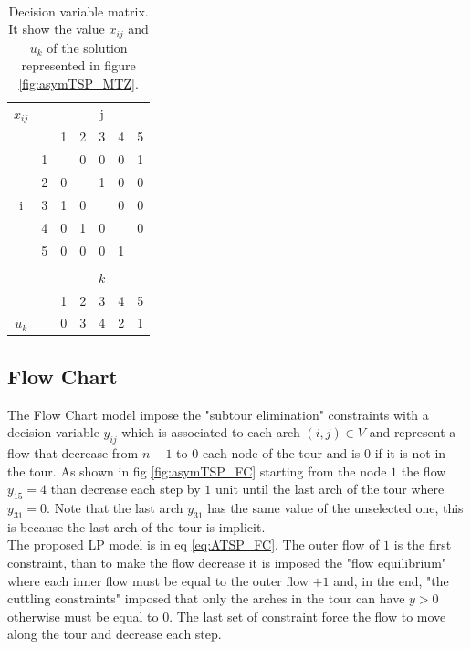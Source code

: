 \begin{table}[h!]
	\begin{center}$  $
		\caption{Decision variable matrix. It show the value $ x_{ij} $ and $ u_k $ of the solution represented in figure \ref{fig:asymTSP_MTZ}. }
		\label{tab:asymTSP_MTZ_solution}
		\begin{tabular}{cc|c|c|c|c|c|}
			 $ x_{ij} $ & \multicolumn{1}{c}{} & \multicolumn{5}{c}{j} \\ %
			& \multicolumn{1}{c}{} & \multicolumn{1}{c}{1} & \multicolumn{1}{c}{2} & \multicolumn{1}{c}{3} & \multicolumn{1}{c}{4} & \multicolumn{1}{c}{5} \\ \cline{3-7}
			\multirow{5}{*}{i} 	& 1 & \cellcolor{Black} & 0 & 0 & 0 & 1 \\ \cline{3-7}
			& 2 & 0 & \cellcolor{Black} & 1 & 0 & 0 \\ \cline{3-7}
			& 3 & 1 & 0 & \cellcolor{Black} & 0 & 0 \\ \cline{3-7}
			& 4 & 0 & 1 & 0 & \cellcolor{Black} & 0 \\ \cline{3-7}
			& 5 & 0 & 0 & 0 & 1 & \cellcolor{Black} \\ \cline{3-7}
			\multicolumn{7}{c}{} \\ 
			
			\multicolumn{2}{c}{} & \multicolumn{5}{c}{$ k $} \\  
			& \multicolumn{1}{c}{} & \multicolumn{1}{c}{1} & \multicolumn{1}{c}{2} & \multicolumn{1}{c}{3} & \multicolumn{1}{c}{4} & \multicolumn{1}{c}{5} \\ \cline{3-7}
 			$ u_k $ &  & 0 & 3 & 4 & 2 & 1 \\ \cline{3-7}
		\end{tabular}
	\end{center}
\end{table}

\subsection{Flow Chart}
The Flow Chart model impose the "subtour elimination" constraints with a decision variable $ y_{ij} $ which is associated to each arch $ (i,j) \in V $ and represent a flow that decrease from $ n-1 $ to $ 0 $ each node of the tour and is $ 0 $ if it is not in the tour. As shown in fig \ref{fig:asymTSP_FC} starting from the node $ 1 $ the flow $ y_{15} = 4 $ than decrease each step by $ 1 $ unit until the last arch of the tour where $ y_{31} = 0 $. Note that the last arch $ y_{31} $ has the same value of the unselected one, this is because the last arch of the tour is implicit. \\
The proposed LP model is in eq \ref{eq:ATSP_FC}. The outer flow of $ 1 $ is the first constraint, than to make the flow decrease it is imposed the "flow equilibrium" where each inner flow must be equal to the outer flow $ +1 $ and, in the end, "the cuttling constraints" imposed that only the arches in the tour can have $ y > 0 $ otherwise must be equal to $ 0 $. The last set of constraint force the flow to move along the tour and decrease each step. \\


